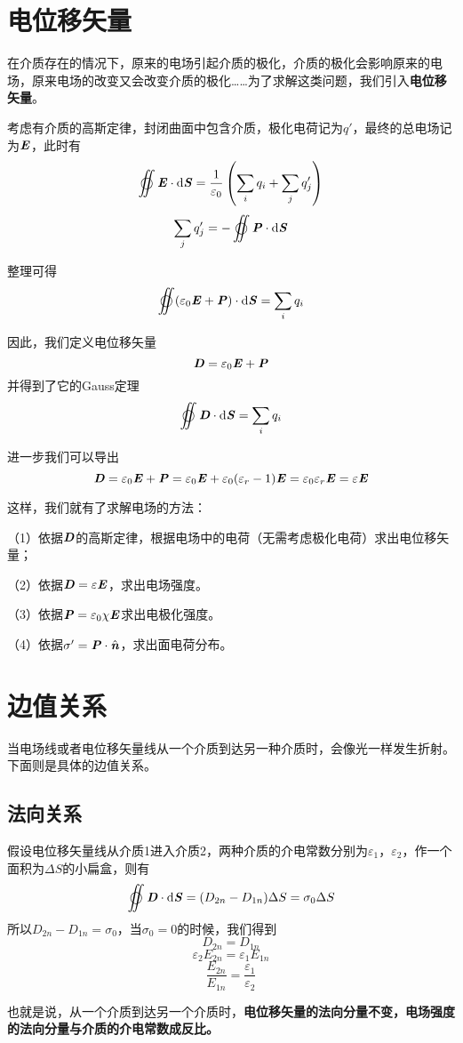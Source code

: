 \documentclass[UTF8,openany]{book}
\begin{document}
	\section{电位移矢量}
	\par 在介质存在的情况下，原来的电场引起介质的极化，介质的极化会影响原来的电场，原来电场的改变又会改变介质的极化……为了求解这类问题，我们引入\textbf{电位移矢量}。
	\par 考虑有介质的高斯定律，封闭曲面中包含介质，极化电荷记为$q'$，最终的总电场记为$\textbf{\textit{E}}$，此时有
	$$\varoiint\textbf{\textit{E}}\cdot\mathrm{d}\textbf{\textit{S}}=\frac{1}{\varepsilon_{0}}\left(\sum_{i}q_i+\sum_{j}q'_j\right)$$
	$$\sum_{j}q'_j=-\varoiint\textbf{\textit{P}}\cdot\mathrm{d}\textbf{\textit{S}}$$
	\par 整理可得
	$$\varoiint(\varepsilon_{0}\textbf{\textit{E}}+\textbf{\textit{P}})\cdot\mathrm{d}\textbf{\textit{S}}=\sum_{i}q_i$$
	\par 因此，我们定义电位移矢量
	$$\textbf{\textit{D}}=\varepsilon_{0}\textbf{\textit{E}}+\textbf{\textit{P}}$$
	并得到了它的Gauss定理
	$$\varoiint\textbf{\textit{D}}\cdot\mathrm{d}\textbf{\textit{S}}=\sum_{i}q_i$$
	\par 进一步我们可以导出
	$$\textbf{\textit{D}}=\varepsilon_{0}\textbf{\textit{E}}+\textbf{\textit{P}}=\varepsilon_{0}\textbf{\textit{E}}+\varepsilon_{0}(\varepsilon_{r}-1)\textbf{\textit{E}}=\varepsilon_{0}\varepsilon_{r}\textbf{\textit{E}}=\varepsilon\textbf{\textit{E}}$$
	\par 这样，我们就有了求解电场的方法：
	\par （1）依据$\textbf{\textit{D}}$的高斯定律，根据电场中的电荷（无需考虑极化电荷）求出电位移矢量；
	\par （2）依据$\textbf{\textit{D}}=\varepsilon\textbf{\textit{E}}$，求出电场强度。
	\par （3）依据$\textbf{\textit{P}}=\varepsilon_{0}\chi\textbf{\textit{E}}$求出电极化强度。
	\par （4）依据$\sigma'=\textbf{\textit{P}}\cdot\hat{\textbf{\textit{n}}}$，求出面电荷分布。
	\section{边值关系}
	\par 当电场线或者电位移矢量线从一个介质到达另一种介质时，会像光一样发生折射。下面则是具体的边值关系。
	\subsection{法向关系}
	\par 假设电位移矢量线从介质1进入介质2，两种介质的介电常数分别为$\varepsilon_{1}$，$\varepsilon_{2}$，作一个面积为$\Delta S$的小扁盒，则有
	$$\varoiint\textbf{\textit{D}}\cdot\mathrm{d}\textbf{\textit{S}}=(D_{2n}-D_{1n})\Delta S=\sigma_{0}\Delta S$$
	所以$D_{2n}-D_{1n}=\sigma_{0}$，当$\sigma_0=0$的时候，我们得到
	$$D_{2n}=D_{1n}$$
	$$\varepsilon_{2}E_{2n}=\varepsilon_{1}E_{1n}$$
	$$\frac{E_{2n}}{E_{1n}}=\frac{\varepsilon_{1}}{\varepsilon_{2}}$$
	\par 也就是说，从一个介质到达另一个介质时，\textbf{电位移矢量的法向分量不变，电场强度的法向分量与介质的介电常数成反比。}
\end{document}
